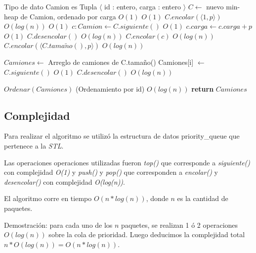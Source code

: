 \documentclass[a4paper, 10pt, twoside]{article}
\newenvironment{pseudo}[1][]{%
    \vspace{0.5em}%
    \begin{algorithmic}%
}
{%
    \end{algorithmic}%
    \vspace{0.5em}%
}
\newcommand{\In}{\textbf{in} }
\newcommand{\Ode}[1]{\hfill $O(#1)$}
\begin{document}
\begin{pseudo}
	\State Tipo de dato Camion es Tupla $\langle$ id : entero, carga : entero  $\rangle$
        \State $C \leftarrow$ nuevo min-heap de Camion, ordenado por carga   \Ode{1}
        \ForAll{$p$ \In $\langle p_1, \ldots, p_n \rangle$}    	
                                     \Ode{1}
                \State $C.encolar(\langle 1 , p \rangle)$       \Ode{log(n)}
                              \Ode{1}
                \State $c : Camion \leftarrow C.siguiente()$   \Ode{1}
                \State $c.carga \leftarrow c.carga + p$			\Ode{1}
                \State $C.desencolar()$                         \Ode{log(n)}
                \State $C.encolar(c)$                           \Ode{log(n)}
            \Else
                \State $C.encolar(\langle C.tama\tilde{n}o(), p \rangle)$ \Ode{log(n)}
            \EndIf
        \EndFor

  		\State $Camiones \leftarrow$ Arreglo de camiones de C.tamaño()
        \ForAll{$i$ \In $\langle 1, \ldots,$ C.tamaño() $\rangle$}			
      		\State Camiones[i] $\leftarrow$ $C.siguiente()$		\Ode{1}
      		\State $C.desencolar()$								\Ode{log(n)}
        \EndFor
        
        \State $Ordenar(Camiones)$ (Ordenamiento por id)		\Ode{log(n)}
        \State \textbf{return} $Camiones$
    \EndProcedure
\end{pseudo}


\subsection{Complejidad}

Para realizar el algoritmo se utilizó la estructura de datos priority\_queue que pertenece a la \textit{STL}.

Las operaciones operaciones utilizadas fueron \textit{top()} que corresponde a \textit{siguiente()} con complejidad \textit{O(1)} y \textit{push()} y \textit{pop()} que corresponden a \textit{encolar()} y \textit{desencolar()} con complejidad \textit{O(log(n))}.

El algoritmo corre en tiempo $O(n*log(n))$, donde $n$ es la cantidad de paquetes.

Demostración: para cada uno de los $n$ paquetes, se realizan 1 ó 2 operaciones $O(log(n))$ sobre la cola de prioridad. Luego deducimos la complejidad total $n * O(log(n)) = O(n * log(n))$.
\end{document}
